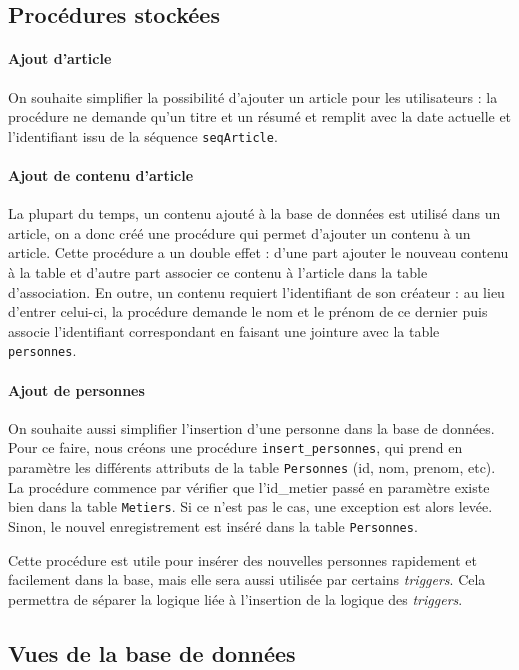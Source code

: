 \subsection{Procédures stockées}

\paragraph{Ajout d'article}{
    On souhaite simplifier la possibilité d'ajouter un article pour les utilisateurs : la procédure ne demande qu'un titre et un résumé et remplit avec la date actuelle et l'identifiant issu de la séquence \verb|seqArticle|.
}

\paragraph{Ajout de contenu d'article}{
    La plupart du temps, un contenu ajouté à la base de données est utilisé dans un article, on a donc créé une procédure qui permet d'ajouter un contenu à un article. Cette procédure a un double effet : d'une part ajouter le nouveau contenu à la table et d'autre part associer ce contenu à l'article dans la table d'association.
    En outre, un contenu requiert l'identifiant de son créateur : au lieu d'entrer celui-ci, la procédure demande le nom et le prénom de ce dernier puis associe l'identifiant correspondant en faisant une jointure avec la table \verb|personnes|.
}

\paragraph{Ajout de personnes}{
    On souhaite aussi simplifier l'insertion d'une personne dans la base de données. Pour ce faire, nous créons une procédure \verb|insert_personnes|, qui prend en paramètre les différents attributs de la table \verb|Personnes| (id, nom, prenom, etc). La procédure commence par vérifier que l'id\_metier passé en paramètre existe bien dans la table \verb|Metiers|. Si ce n'est pas le cas, une exception est alors levée. Sinon, le nouvel enregistrement est inséré dans la table \verb|Personnes|.

    Cette procédure est utile pour insérer des nouvelles personnes rapidement et facilement dans la base, mais elle sera aussi utilisée par certains \textit{triggers}. Cela permettra de séparer la logique liée à l'insertion de la logique des \textit{triggers}.
}

\subsection{Vues de la base de données}


